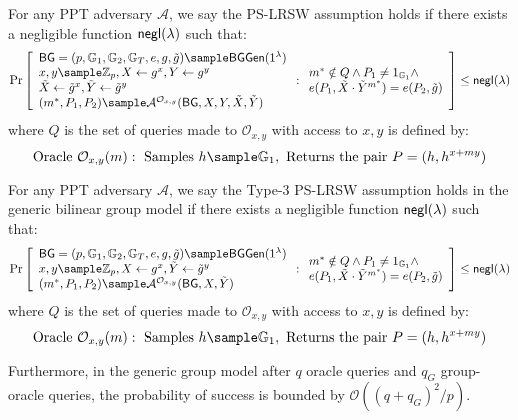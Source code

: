 \begin{definition}
For any PPT adversary $\mathcal{A}$, we say the PS-LRSW assumption holds if there exists a negligible function ${\mathsf{negl}(\lambda)}$ such that:
$$\Pr\left[\begin{array}{l}
    \BG = (p, \G_1, \G_2, \G_T, e, g, \tilde{g}) \sample \BGGen(1^\lambda) \\
    x,y \sample \Z_p, X \gets g^x, Y \gets g^y \\
    \tilde{X} \gets \tilde{g}^x, \tilde{Y} \gets \tilde{g}^y \\
    (m^*, P_1, P_2) \sample \mathcal{A}^{\mathcal{O}_{x,y}}(\BG, X, Y, \tilde{X}, \tilde{Y})
\end{array} : \begin{array}{l}
    m^* \notin Q \land P_1 \neq 1_{\G_1} \land \\
    e(P_1, \tilde{X} \cdot \tilde{Y}^{m^*}) = e(P_2, \tilde{g})
\end{array}\right] \leq \negl$$
where $Q$ is the set of queries made to $\mathcal{O}_{x,y}$ with access to $x,y$ is defined by:
\[
\text{Oracle }\mathcal{O}_{x,y}(m): \text{ Samples } h \sample \G_1, \text{ Returns the pair }P = (h, h^{x+my})
\]
\end{definition}



\begin{definition}
For any PPT adversary $\mathcal{A}$, we say the Type-3 PS-LRSW assumption holds in the generic bilinear group model if there exists a negligible function ${\mathsf{negl}(\lambda)}$ such that:
$$\Pr\left[\begin{array}{l}
    \BG = (p, \G_1, \G_2, \G_T, e, g, \tilde{g}) \sample \BGGen(1^\lambda) \\
    x,y \sample \Z_p, X \gets g^x, \tilde{Y} \gets \tilde{g}^y \\
    (m^*, P_1, P_2) \sample \mathcal{A}^{\mathcal{O}_{x,y}}(\BG, X, \tilde{Y})
\end{array} : \begin{array}{l}
    m^* \notin Q \land P_1 \neq 1_{\G_1} \land \\
    e(P_1, \tilde{X} \cdot \tilde{Y}^{m^*}) = e(P_2, \tilde{g})
\end{array}\right] \leq \negl$$
where $Q$ is the set of queries made to $\mathcal{O}_{x,y}$ with access to $x,y$ is defined by:
\[
\text{Oracle }\mathcal{O}_{x,y}(m): \text{ Samples } h \sample \G_1, \text{ Returns the pair } P = (h, h^{x+my})
\]

\noindent Furthermore, in the generic group model after $q$ oracle queries and $q_G$ group-oracle queries, the probability of success is bounded by $\mathcal{O}((q + q_G)^2/p)$.
\end{definition}



